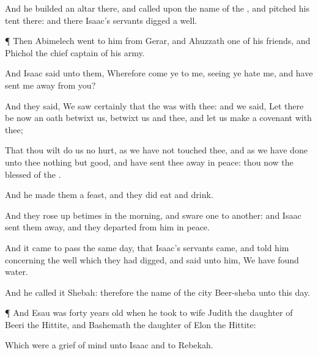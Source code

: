 {And he
builded an
altar there, and
called upon the
name of the
{}, and
pitched his
tent there: and there
Isaac’s
servants
digged a
well.


\par }{\PP {}¶ Then
Abimelech
went to him from
Gerar, and
Ahuzzath one of his
friends, and
Phichol the chief
captain of his
army.

And
Isaac
said unto them,
Wherefore
come ye to me, seeing ye
hate me, and have sent me
away from you?

And they
said, We
saw
certainly that the
{} was with thee: and we
said, Let there be now an
oath
betwixt us,
{}
betwixt us and thee, and let us
make a
covenant with thee;

That thou wilt
do us no
hurt, as we have not
touched thee, and as we have
done unto thee nothing
but
good, and have sent thee
away in
peace: thou
{}
now the
blessed of the
{}.

And he
made them a
feast, and they did
eat and
drink.

And they rose up
betimes in the
morning, and
sware
one to
another: and
Isaac sent them
away, and they
departed from him in
peace.

And it came to pass the same
day, that
Isaac’s
servants
came, and
told him
concerning the
well which they had
digged, and
said unto him, We have
found
water.

And he
called it
Shebah: therefore the
name of the
city
{}
Beer-sheba unto this
day.


\par }{\PP {}¶ And
Esau was
forty
years
old when he
took to
wife
Judith the
daughter of
Beeri the
Hittite, and
Bashemath the
daughter of
Elon the
Hittite:

Which were a
grief of
mind unto
Isaac and to
Rebekah.




\par }
